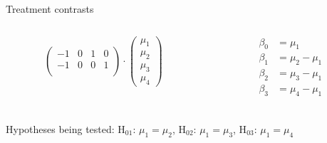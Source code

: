 \documentclass[aspectratio=169]{beamer}
\begin{document}
\begin{frame}{Treatment contrasts}
\begin{columns}
\begin{column}[t]{.5\textwidth}
\[\begin{pmatrix}
  -1 & 0 & 1 & 0 \\ 
  -1 & 0 & 0 & 1 \\ 
  \end{pmatrix} \cdot
  \begin{pmatrix}
    \mu_1 \\
    \mu_2 \\
    \mu_3 \\
    \mu_4
  \end{pmatrix}
\]
    \end{column}
    \begin{column}[t]{.5\textwidth}
\begin{align*}
  \beta_0 & = \mu_1 \\
  \beta_1 & = \mu_2 - \mu_1 \\
  \beta_2 & = \mu_3 - \mu_1 \\
  \beta_3 & = \mu_4 - \mu_1 \\
\end{align*}
    \end{column}
  \end{columns}
  \vspace{-.8cm}
Hypotheses being tested:
H$_{01}$: $\mu_1 = \mu_2$,
H$_{02}$: $\mu_1 = \mu_3$,
H$_{03}$: $\mu_1 = \mu_4$
\end{frame}
\end{document}
